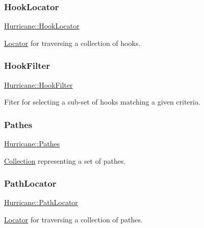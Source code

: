 \subsubsection{\texorpdfstring{Hook\+Locator}{HookLocator}}
{\footnotesize\ttfamily \mbox{\hyperlink{namespaceHurricane_aca3a5babe6265eb9f140112d8e8b79e6}{Hurricane\+::\+Hook\+Locator}}}

\mbox{\hyperlink{classHurricane_1_1Locator}{Locator}} for traversing a collection of hooks. \mbox{\label{namespaceHurricane_a9287de05984b91e55592a77e8d394324}} 
\subsubsection{\texorpdfstring{Hook\+Filter}{HookFilter}}
{\footnotesize\ttfamily \mbox{\hyperlink{namespaceHurricane_a9287de05984b91e55592a77e8d394324}{Hurricane\+::\+Hook\+Filter}}}

Fiter for selecting a sub-\/set of hooks matching a given criteria. \mbox{\label{namespaceHurricane_a77e8a0f11b7d0d65a47a592f7bdfd061}} 
\subsubsection{\texorpdfstring{Pathes}{Pathes}}
{\footnotesize\ttfamily \mbox{\hyperlink{namespaceHurricane_a77e8a0f11b7d0d65a47a592f7bdfd061}{Hurricane\+::\+Pathes}}}

\mbox{\hyperlink{classHurricane_1_1Collection}{Collection}} representing a set of pathes. \mbox{\label{namespaceHurricane_a4077fe144cc9efa686ec63667b7dd9bf}} 
\subsubsection{\texorpdfstring{Path\+Locator}{PathLocator}}
{\footnotesize\ttfamily \mbox{\hyperlink{namespaceHurricane_a4077fe144cc9efa686ec63667b7dd9bf}{Hurricane\+::\+Path\+Locator}}}

\mbox{\hyperlink{classHurricane_1_1Locator}{Locator}} for traversing a collection of pathes. \mbox{\label{namespaceHurricane_af42ed7a6acaba43b9d5f30b789105bc1}} 
